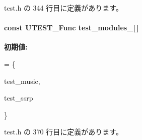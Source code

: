  test.\+h の 344 行目に定義があります。

\paragraph[{test\+\_\+modules\+\_\+}]{\setlength{\rightskip}{0pt plus 5cm}const U\+T\+E\+S\+T\+\_\+\+Func test\+\_\+modules\+\_\+\mbox{[}$\,$\mbox{]}\hspace{0.3cm}{\ttfamily [static]}}\label{test_8h_af4c691f85a9ae8b544bc41f208273702_af4c691f85a9ae8b544bc41f208273702}
{\bfseries 初期値\+:}
\begin{DoxyCode}
= \{

    test_music,


    test_ssrp

\}
\end{DoxyCode}


 test.\+h の 370 行目に定義があります。

